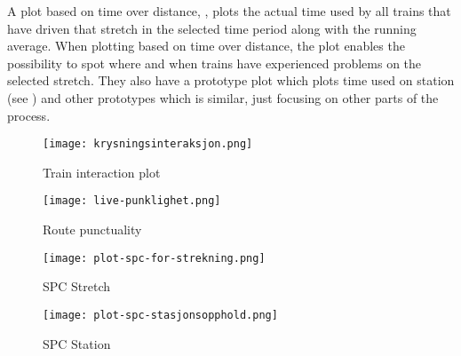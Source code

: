A plot based on time over distance, , plots the
actual time used by all trains that have driven that stretch in the selected
time period along with the running average. When plotting based on time over 
distance, the plot enables the possibility to spot where and
when trains have experienced problems on the selected stretch. They also have a
prototype plot which plots time used on station (see )
and other prototypes which is similar, just focusing on other parts of the
process.  %



\begin{figure}[!htbp]
	\texttt{[image: krysningsinteraksjon.png]}
	\caption[Train interaction plot]{Train interaction plot \cite{sintefPresis}}
	\label{fig:krysningsinteraksjon}
\end{figure}

\begin{figure}[!htbp]
	\texttt{[image: live-punklighet.png]}
	\caption[Route punctuality]{Route punctuality\cite{sintefPresis}}
	\label{fig:live-punklighet}
\end{figure}

\begin{figure}[!htbp]
	\texttt{[image: plot-spc-for-strekning.png]}
	\caption[SPC Stretch]{SPC Stretch \cite{sintefPresis}}
	\label{fig:plot-spc-for-strekning}
\end{figure}

\begin{figure}[!htbp]
	\texttt{[image: plot-spc-stasjonsopphold.png]}
	\caption[SPC Station]{SPC Station \cite{sintefPresis}}
	\label{fig:plot-spc-for-stasjonsopphold}
\end{figure}

